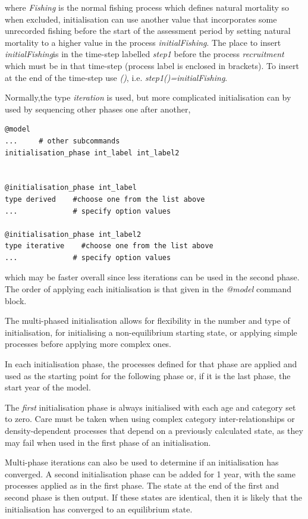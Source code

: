 where \textit{ Fishing} is the normal fishing process which defines natural mortality so when excluded, initialisation can use another value that incorporates some unrecorded fishing before the start of the assessment period by setting natural mortality to a higher value in the process \textit{initialFishing}. The place to insert \textit{initialFishing}is in the time-step labelled \textit{step1} before the process \textit{recruitment} which must be in that time-step (process label is enclosed in brackets). To insert at the end of the time-step use \textit{()}, i.e. \textit{step1()=initialFishing}.

Normally,the type \textit{iteration} is used, but more complicated initialisation can by used by sequencing other phases one after another,

{\small{\begin{verbatim}
@model
...     # other subcommands
initialisation_phase int_label int_label2


@initialisation_phase int_label
type derived    #choose one from the list above
...             # specify option values

@initialisation_phase int_label2
type iterative    #choose one from the list above
...             # specify option values

\end{verbatim}}}

which may be faster overall since less iterations can be used in the second phase. The order of applying each initialisation is that given in the \textit{@model} command block.

The multi-phased initialisation allows for flexibility in the number and type of initialisation, for initialising a non-equilibrium starting state, or applying simple processes before applying more complex ones.

In each initialisation phase, the processes defined for that phase are applied and used as the starting point for the following phase or, if it is the last phase, the start year of the model.

The \emph{first} initialisation phase is always initialised with each age and category set to zero. Care must be taken when using complex category inter-relationships or density-dependent processes that depend on a previously calculated state, as they may fail when used in the first phase of an initialisation.

Multi-phase iterations can also be used to determine if an initialisation has converged. A second initialisation phase can be added for 1 year, with the same processes applied as in the first phase. The state at the end of the first and second phase is then output. If these states are identical, then it is likely that the initialisation has converged to an equilibrium state.

